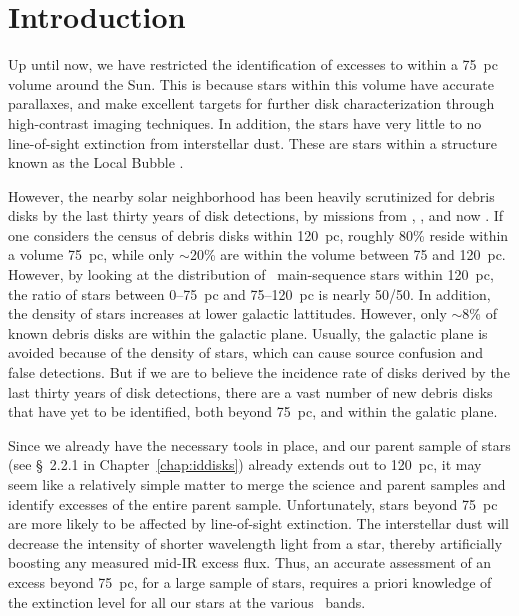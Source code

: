 \section{Introduction}

    Up until now, we have restricted the identification of excesses to within a 75~pc volume around the Sun. This is because stars within this volume have accurate parallaxes, and make excellent targets for further disk characterization through high-contrast imaging techniques. In addition, the stars have very little to no line-of-sight extinction from interstellar dust. These are stars within a structure known as the Local Bubble \citep{Lallement2003}. 
    
    However, the nearby solar neighborhood has been heavily scrutinized for debris disks by the last thirty years of disk detections, by missions from \iras, \spitzer, and now \WS. If one considers the census of debris disks within 120~pc, roughly 80\%  reside within a volume 75~pc, while only $\sim$20\% are within the volume between 75 and 120~pc. However, by looking at the distribution of \hip\ main-sequence stars within 120~pc, the ratio of stars between 0--75~pc and 75--120~pc is nearly 50/50. In addition, the density of stars increases at lower galactic lattitudes. However, only $\sim$8\% of known debris disks are within the galactic plane. Usually, the galactic plane is avoided because of the density of stars, which can cause source confusion and false detections. But if we are to believe the incidence rate of disks derived by the last thirty years of disk detections, there are a vast number of new debris disks that have yet to be identified, both beyond 75~pc, and within the galatic plane.
    
    
    
    
    Since we already have the necessary tools in place, and our parent sample of stars (see \S~2.2.1 in Chapter~\ref{chap:iddisks}) already extends out to 120~pc, it may seem like a relatively simple matter to merge the science and parent samples and identify excesses of the entire parent sample. Unfortunately, stars beyond 75~pc are more likely to be affected by line-of-sight extinction. The interstellar dust will decrease the intensity of shorter wavelength light from a star, thereby artificially boosting any measured mid-IR excess flux. Thus, an accurate assessment of an excess beyond 75~pc, for a large sample of stars, requires a priori knowledge of the extinction level for all our stars at the various \WS\ bands.
    
